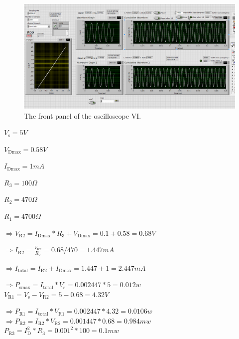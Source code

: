 \documentclass[11pt]{article}
\begin{document}
\begin{figure}[H]
 \begin{center}
  \includegraphics[width=\linewidth/1]{act1a100Hz}
  \caption{The front panel of the oscilloscope VI.}
  \label{fig:act1a100Hz}
 \end{center}
\end{figure}



$V_{\mathrm {s} }=5 V$

$V_{\mathrm {Dmax} }=0.58 V$

$I_{\mathrm {Dmax} }=1 mA$

$R_{\mathrm {3} }=100 \Omega$

$R_{\mathrm {2} }=470 \Omega$

$R_{\mathrm {1} }=4700 \Omega$

$\Rightarrow V_{\mathrm {R2} }=I_{\mathrm {Dmax} }*R_{\mathrm {3} }+V_{\mathrm {Dmax} }=0.1+0.58=0.68 V$

$\Rightarrow I_{\mathrm {R2} }={\frac {V_{\mathrm {R2} }}{R_{\mathrm {2} }}}=0.68/470=1.447 mA $

$\Rightarrow I_{\mathrm {total} }=I_{\mathrm {R2} }+I_{\mathrm {Dmax} }=1.447+1=2.447 mA $

$\Rightarrow P_{\mathrm {smax} }=I_{\mathrm {total} }*V_{\mathrm {s} }=0.002447*5=0.012 w $ \\[1em]

$ V_{\mathrm {R1} }=V_{\mathrm {s} }-V_{\mathrm {R2} }=5-0.68=4.32 V $

$\Rightarrow P_{\mathrm {R1} }=I_{\mathrm {total} }*V_{\mathrm {R1} }=0.002447*4.32=0.0106 w $ \\[1em]

$\Rightarrow P_{\mathrm {R2} }=I_{\mathrm {R2} }*V_{\mathrm {R2} }=0.001447*0.68=0.984 mw $ \\[1em]

$P_{\mathrm {R3} }=I_{\mathrm {D} }^2*R_{\mathrm {3} }=0.001^2*100=0.1 mw $
\end{document}
